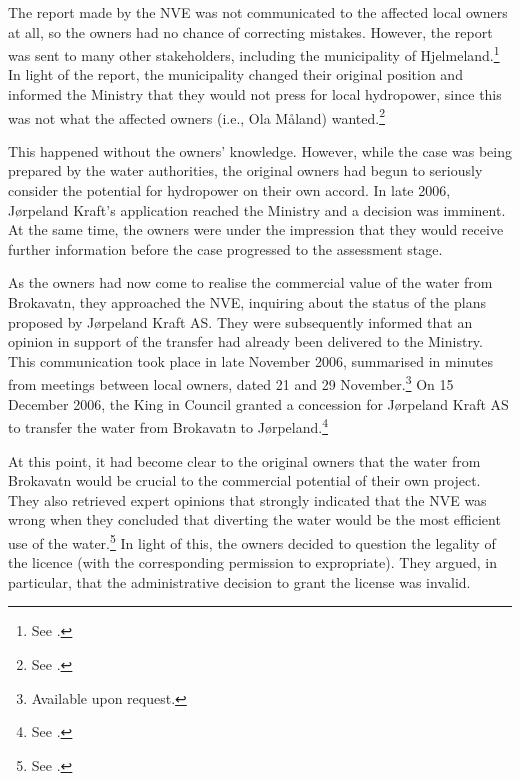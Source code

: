 The report made by the NVE was not communicated to the affected local owners at all, so the owners had no chance of correcting mistakes. However, the report was sent to many other stakeholders, including the municipality of Hjelmeland.\footnote{See \cite[24]{jorpeland09}.} In light of the report, the municipality changed their original position and informed the Ministry that they would not press for local hydropower, since this was not what the affected owners (i.e., Ola Måland) wanted.\footnote{See \cite[24]{jorpeland09}.}

This happened without the owners' knowledge. However, while the case was being prepared by the water authorities, the original owners had begun to seriously consider the potential for hydropower on their own accord. In late 2006, Jørpeland Kraft's application reached the Ministry and a decision was imminent. At the same time, the owners were under the impression that they would receive further information before the case progressed to the assessment stage.

As the owners had now come to realise the commercial value of the water from Brokavatn, they approached the NVE, inquiring about the status of the plans proposed by Jørpeland Kraft AS. They were subsequently informed that an opinion in support of the transfer had already been delivered to the Ministry. This communication took place in late November 2006, summarised in minutes from meetings between local owners, dated 21 and 29 November.\footnote{Available upon request.} On 15 December 2006, the King in Council granted a concession for Jørpeland Kraft AS to transfer the water from Brokavatn to Jørpeland.\footnote{See \cite[3]{jorpeland09}.}

At this point, it had become clear to the original owners that the water from Brokavatn would be crucial to the commercial potential of their own project. They also retrieved expert opinions that strongly indicated that the NVE was wrong when they concluded that diverting the water would be the most efficient use of the water.\footnote{See \cite[23]{jorpeland09}.} In light of this, the owners decided to question the legality of the licence (with the corresponding permission to expropriate). They argued, in particular, that the administrative decision to grant the license was invalid.

